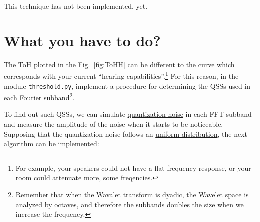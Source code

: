 This technique has not been implemented, yet.

\section{What you have to do?}


The ToH plotted in the Fig.~\ref{fig:ToHH} can be
different to the curve which corresponds with your current ``hearing
capabilities''.\footnote{For example, your speakers could not have a
  flat frequency response, or your room could attenuate more, some
  freqencies.} For this reason, in the module \verb|threshold.py|,
implement a procedure for determining the QSSs used in
each Fourier subband\footnote{Remember that when the
  \href{https://en.wikipedia.org/wiki/Wavelet_transform}{Wavalet
    transform} is
  \href{https://en.wikipedia.org/wiki/Dyadic_rational}{dyadic}, the
  \href{https://en.wikipedia.org/wiki/Discrete_wavelet_transform}{Wavelet
    space} is analyzed by
  \href{https://en.wikipedia.org/wiki/Octave_band}{octaves}, and
  therefore the
  \href{https://en.wikipedia.org/wiki/Filter_bank}{subbands} doubles
  the size when we increase the frequency.}.
  
To find out such QSSs, we can simulate
\href{https://en.wikipedia.org/wiki/Quantization_(signal_processing)}{quantization
  noise} in each FFT subband and measure the amplitude of the noise when
it starts to be noticeable. Supposing that the quantization noise
follows an
\href{https://en.wikipedia.org/wiki/Continuous_uniform_distribution}{uniform
  distribution}, the next algorithm can be implemented:

